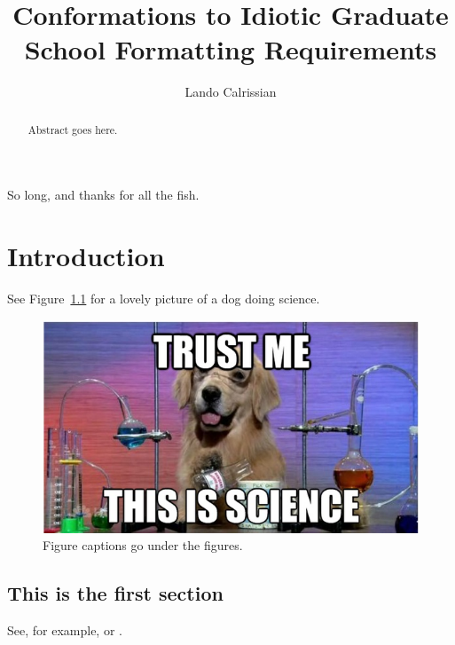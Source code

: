 \documentclass[nosmallcaps]{csuthesis} %
\title{Conformations to Idiotic Graduate School Formatting Requirements}
\author{Lando Calrissian}
\begin{document}
\frontmatter

\begin{abstract}
Abstract goes here.
\end{abstract}

\begin{acknowledgements}
So long, and thanks for all the fish. 
\end{acknowledgements}

\maketitle
\tableofcontents
\cleardoublepage
\listoftables
\listoffigures


\mainmatter
\chapter{Introduction}
\lipsum[1] 

See Figure~\ref{dog} for a lovely picture of a dog doing science. \lipsum[2]

\begin{figure}[htbp]
\includegraphics{science-dog.jpg}
\caption{Figure captions go under the figures.} \label{dog}
\end{figure}

\section{{This is the first section}} 
\lipsum[3] See, for example, \cite{Item1, Item2, Item3, Item4} or \cite{Item5, Item6, Item7, Item8, Item9, Item10, Item11}. \lipsum[4]
\end{document}

